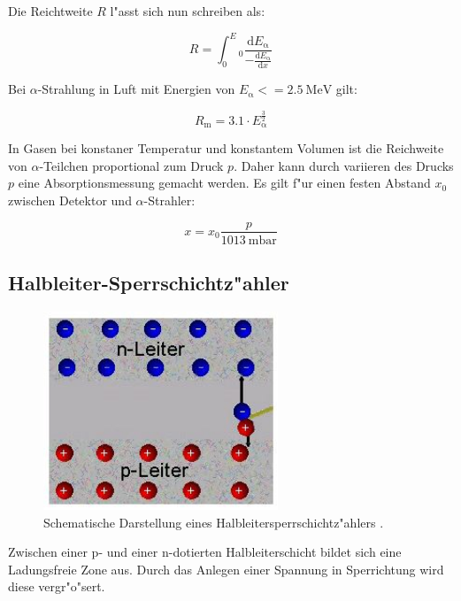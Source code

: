 Die Reichtweite $R$ l"asst sich nun schreiben als:

\begin{equation}
	R = \int_0^E_\mathrm{0} \frac{\mathrm{d}E_\mathrm{\alpha}}{- \frac{\mathrm{d}E_\mathrm{\alpha}}{\mathrm{d}x}}
\end{equation}

Bei $\alpha$-Strahlung in Luft mit Energien von $E_\mathrm{\alpha} <= \SI{2.5}{\mega\electronvolt}$ gilt:

\begin{equation}
	R_\mathrm{m} = 3.1 \cdot E_\mathrm{\alpha}^\frac{3}{2}
\end{equation}

In Gasen bei konstaner Temperatur und konstantem Volumen ist die Reichweite von $\alpha$-Teilchen proportional zum Druck $p$. Daher kann durch variieren des Drucks $p$ eine Absorptionsmessung gemacht werden. Es gilt f"ur einen festen Abstand $x_\mathrm{0}$ zwischen Detektor und $\alpha$-Strahler:

\begin{equation}
	x = x_\mathrm{0} \frac{p}{\SI{1013}{\milli\bar}}
\end{equation}

\subsection{Halbleiter-Sperrschichtz"ahler} %
\label{sub:halbleiter_sperrschichtz_ahler}


\begin{figure}
	\centering
	\includegraphics[width = 7cm]{img/pn.JPG}
	\caption{Schematische Darstellung eines Halbleitersperrschichtz"ahlers \cite{pn}.}
	\label{fig:pn}
\end{figure}

Zwischen einer p- und einer n-dotierten Halbleiterschicht bildet sich eine Ladungsfreie Zone aus. Durch das Anlegen einer Spannung in Sperrichtung wird diese vergr"o"sert.

